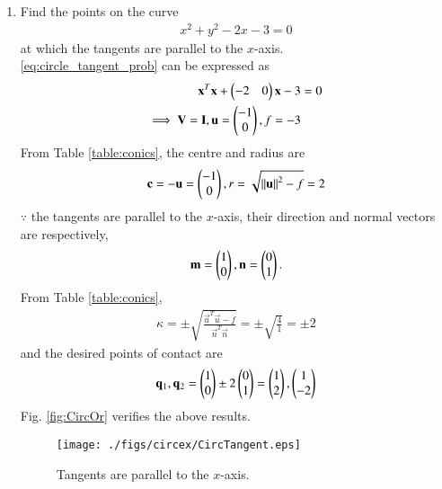 \begin{enumerate}[label=\thesubsection.\arabic*.,ref=\thesubsection.\theenumi]
\item 
Find the points on the curve  
\begin{align}
x^2+y^2-2x-3 = 0
\label{eq:circle_tangent_prob}
\end{align}
at which the tangents are parallel to the $x$-axis.
\\
\solution \eqref{eq:circle_tangent_prob} can be expressed as
\begin{align}
\mathbf{x}^T\mathbf{x}+\begin{pmatrix}-2 & 0\end{pmatrix}\mathbf{x}-3 &= 0
\label{eq:circle_tangent_prob_vec}
\\
\implies \mathbf{V} = \mathbf{I}, \mathbf{u} = \begin{pmatrix}-1 \\ 0\end{pmatrix}, f = -3
\label{eq:circle_tangent_prob_uf}
\end{align}
From Table \ref{table:conics}, the centre and radius are
\begin{align}
\mathbf{c} = -\mathbf{u} = \begin{pmatrix}-1 \\ 0\end{pmatrix}, r =\sqrt{\left\lVert\mathbf{u}\right\rVert^2-f} = 2
\end{align}
$\because$ the tangents are parallel to the $x$-axis, their direction and normal vectors are respectively,
\begin{align}
\mathbf{m} = \begin{pmatrix}1\\0\end{pmatrix},
\mathbf{n} = \begin{pmatrix}0\\1\end{pmatrix}.
\end{align}
From Table \ref{table:conics},
\begin{align}
\kappa = \pm \sqrt{\frac{\vec{u}^T\vec{u}-f}{\vec{n}^T\vec{n}}} = \pm \sqrt{\frac{4}{1}} = \pm 2
\end{align}
and the desired points of contact are 
\begin{align}
\mathbf{q}_1, \mathbf{q}_2 = \begin{pmatrix}1\\0\end{pmatrix}\pm 2\begin{pmatrix}0\\1\end{pmatrix} =  
\begin{pmatrix}1 \\  2\end{pmatrix},
\begin{pmatrix}1 \\  -2\end{pmatrix}
\end{align}
%
Fig. \ref{fig:CircOr}	verifies the above results.
\begin{figure}[!ht]
\centering
\texttt{[image: ./figs/circex/CircTangent.eps]}
\caption{Tangents are parallel to the $x$-axis. }
\label{fig:CircTangent}	
\end{figure}

\end{enumerate}
